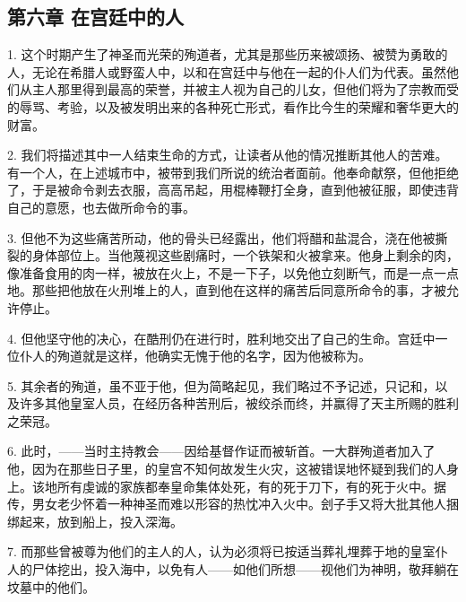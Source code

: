 
\subsection{第六章 在宫廷中的人}

1. 这个时期产生了神圣而光荣的殉道者，尤其是那些历来被颂扬、被赞为勇敢的人，无论在希腊人或野蛮人中，以和在宫廷中与他在一起的仆人们为代表。虽然他们从主人那里得到最高的荣誉，并被主人视为自己的儿女，但他们将为了宗教而受的辱骂、考验，以及被发明出来的各种死亡形式，看作比今生的荣耀和奢华更大的财富。\par

2. 我们将描述其中一人结束生命的方式，让读者从他的情况推断其他人的苦难。有一个人，在上述城市中，被带到我们所说的统治者面前。他奉命献祭，但他拒绝了，于是被命令剥去衣服，高高吊起，用棍棒鞭打全身，直到他被征服，即使违背自己的意愿，也去做所命令的事。\par

3. 但他不为这些痛苦所动，他的骨头已经露出，他们将醋和盐混合，浇在他被撕裂的身体部位上。当他蔑视这些剧痛时，一个铁架和火被拿来。他身上剩余的肉，像准备食用的肉一样，被放在火上，不是一下子，以免他立刻断气，而是一点一点地。那些把他放在火刑堆上的人，直到他在这样的痛苦后同意所命令的事，才被允许停止。\par

4. 但他坚守他的决心，在酷刑仍在进行时，胜利地交出了自己的生命。宫廷中一位仆人的殉道就是这样，他确实无愧于他的名字，因为他被称为。\par

5. 其余者的殉道，虽不亚于他，但为简略起见，我们略过不予记述，只记和，以及许多其他皇室人员，在经历各种苦刑后，被绞杀而终，并赢得了天主所赐的胜利之荣冠。\par

6. 此时，——当时主持教会——因给基督作证而被斩首。一大群殉道者加入了他，因为在那些日子里，的皇宫不知何故发生火灾，这被错误地怀疑到我们的人身上。该地所有虔诚的家族都奉皇命集体处死，有的死于刀下，有的死于火中。据传，男女老少怀着一种神圣而难以形容的热忱冲入火中。刽子手又将大批其他人捆绑起来，放到船上，投入深海。\par

7. 而那些曾被尊为他们的主人的人，认为必须将已按适当葬礼埋葬于地的皇室仆人的尸体挖出，投入海中，以免有人——如他们所想——视他们为神明，敬拜躺在坟墓中的他们。\par


